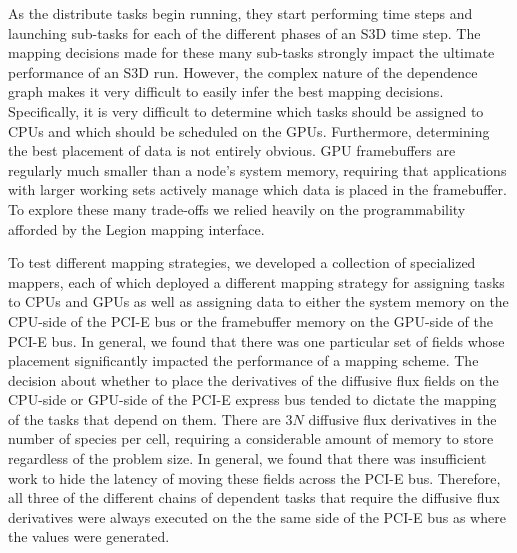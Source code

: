 As the distribute tasks begin running, they start
performing time steps and launching sub-tasks for each
of the different phases of an S3D time step. The mapping
decisions made for these many sub-tasks strongly impact
the ultimate performance of an S3D run. However, the
complex nature of the dependence graph makes it very
difficult to easily infer the best mapping decisions.
Specifically, it is very difficult to determine which
tasks should be assigned to CPUs and which should be
scheduled on the GPUs. Furthermore, determining the
best placement of data is not entirely obvious. GPU
framebuffers are regularly much smaller than a node's
system memory, requiring that applications with larger
working sets actively manage which data is placed
in the framebuffer. To explore these many trade-offs
we relied heavily on the programmability afforded by 
the Legion mapping interface.

To test different mapping strategies, we developed
a collection of specialized mappers, each of which
deployed a different mapping strategy for assigning
tasks to CPUs and GPUs as well as assigning data
to either the system memory on the CPU-side of the
PCI-E bus or the framebuffer memory on the GPU-side
of the PCI-E bus. In general, we found that there
was one particular set of fields whose 
placement significantly impacted the performance 
of a mapping scheme. The decision about whether to
place the derivatives of the diffusive flux fields 
on the CPU-side or GPU-side of the PCI-E express
bus tended to dictate the mapping of the tasks
that depend on them. There are $3N$ diffusive flux
derivatives in the number of species per cell,
requiring a considerable amount of memory to store
regardless of the problem size. In general, we 
found that there was insufficient work to hide the
latency of moving these fields across the PCI-E
bus. Therefore, all three of the different chains
of dependent tasks that require the diffusive
flux derivatives were always executed on the 
the same side of the PCI-E bus as where the
values were generated.

